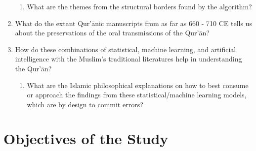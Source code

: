 \begin{enumerate}
\begin{enumerate}
        \item What are the themes from the structural borders found by the algorithm?
    \end{enumerate}
    \item What do the extant Qur'\=anic manuscripts from as far as 660 - 710 CE tells us about the preservations of the oral transmissions of the Qur'\=an?
    
    \item How do these combinations of statistical, machine learning, and artificial intelligence with the Muslim's traditional literatures help in understanding the Qur'\=an?
    \begin{enumerate}
        \item What are the Islamic philosophical explanations on how to best consume or approach the findings from these statistical/machine learning models, which are by design to commit errors?
    \end{enumerate}
\end{enumerate}
\section{Objectives of the Study}\label{sec:objectives}

